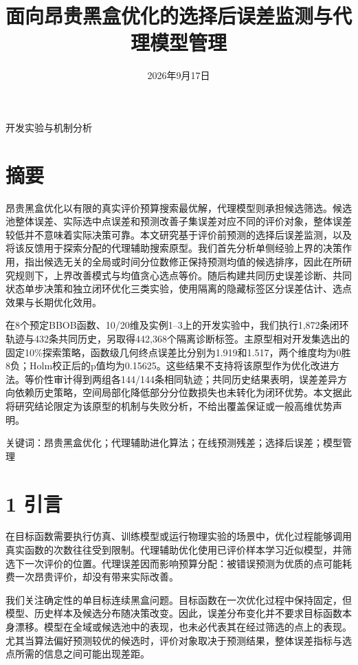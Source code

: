 \documentclass[11pt,a4paper]{article}
\title{面向昂贵黑盒优化的选择后误差监测与代理模型管理}
\author{}
\date{2026年9月17日}
\begin{document}
\maketitle
\begin{center}开发实验与机制分析\end{center}
\hypertarget{ux6458ux8981}{%
\section{摘要}\label{ux6458ux8981}}

昂贵黑盒优化以有限的真实评价预算搜索最优解，代理模型则承担候选筛选。候选池整体误差、实际选中点误差和预测改善子集误差对应不同的评价对象，整体误差较低并不意味着实际决策可靠。本文研究基于评价前预测的选择后误差监测，以及将该反馈用于探索分配的代理辅助搜索原型。我们首先分析单侧经验上界的决策作用，指出候选无关的全局或时间分位数修正保持预测均值的候选排序，因此在所研究规则下，上界改善模式与均值贪心选点等价。随后构建共同历史误差诊断、共同状态单步决策和独立闭环优化三类实验，使用隔离的隐藏标签区分误差估计、选点效果与长期优化效用。

在8个预定BBOB函数、10/20维及实例1--3上的开发实验中，我们执行1,872条闭环轨迹与432条共同历史，另取得442,368个隔离诊断标签。主原型相对开发集选出的固定10\%探索策略，函数级几何终点误差比分别为1.919和1.517，两个维度均为0胜8负；Holm校正后的p值均为0.15625。这些结果不支持将该原型作为优化改进方法。等价性审计得到两组各144/144条相同轨迹；共同历史结果表明，误差差异方向依赖历史策略，空间局部化降低部分分位数损失也未转化为闭环优势。本文据此将研究结论限定为该原型的机制与失败分析，不给出覆盖保证或一般高维优势声明。

关键词：昂贵黑盒优化；代理辅助进化算法；在线预测残差；选择后误差；模型管理

\hypertarget{ux5f15ux8a00}{%
\section{1 引言}\label{ux5f15ux8a00}}

在目标函数需要执行仿真、训练模型或运行物理实验的场景中，优化过程能够调用真实函数的次数往往受到限制。代理辅助优化使用已评价样本学习近似模型，并筛选下一次评价的位置。代理误差因而影响预算分配：被错误预测为优质的点可能耗费一次昂贵评价，却没有带来实际改善。

我们关注确定性的单目标连续黑盒问题。目标函数在一次优化过程中保持固定，但模型、历史样本及候选分布随决策改变。因此，误差分布变化并不要求目标函数本身漂移。模型在全域或候选池中的表现，也未必代表其在经过筛选的点上的表现。尤其当算法偏好预测较优的候选时，评价对象取决于预测结果，整体误差指标与选点所需的信息之间可能出现差距。
\end{document}
